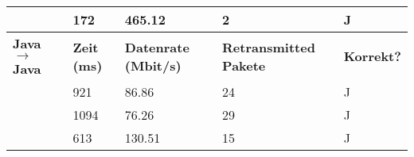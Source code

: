 \documentclass{article}
\begin{document}
\begin{table}[]
{\begin{tabular}{|l|l|l|l|l|}
                & 172      & 465.12          & 2        & J        \\ \hline
                \textbf{Java $\rightarrow$ Java} & \textbf{Zeit (ms)} & \textbf{Datenrate (Mbit/s)} & \textbf{Retransmitted Pakete} & \textbf{Korrekt?} \\ \hline
                & 921       & 86.86          & 24       & J        \\ \cline{2-4}
                & 1094      & 76.26          & 29       & J        \\ \cline{2-4}
                & 613       & 130.51         & 15       & J        \\ \hline
            \end{tabular}
        }
    \end{table}
\end{document}
